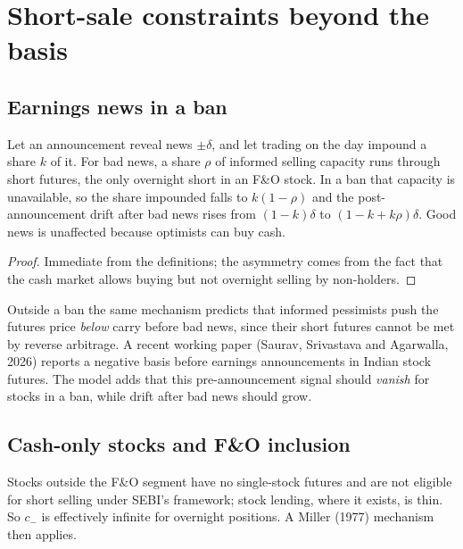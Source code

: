 \section{Short-sale constraints beyond the basis}\label{sec:short}
\subsection{Earnings news in a ban}
\begin{proposition}\label{prop:news}
Let an announcement reveal news $\pm\delta$, and let trading on the day impound a share $k$ of it. For bad news, a share
$\rho$ of informed selling capacity runs through short futures, the only overnight short in an F\&O stock. In a ban that
capacity is unavailable, so the share impounded falls to $k(1-\rho)$ and the post-announcement drift after bad news rises
from $(1-k)\delta$ to $(1-k+k\rho)\delta$. Good news is unaffected because optimists can buy cash.
\end{proposition}
\begin{proof}
Immediate from the definitions; the asymmetry comes from the fact that the cash market allows buying but not overnight
selling by non-holders.
\end{proof}
\begin{remark}
Outside a ban the same mechanism predicts that informed pessimists push the futures price \emph{below} carry before bad
news, since their short futures cannot be met by reverse arbitrage. A recent working paper (Saurav, Srivastava and
Agarwalla, 2026) reports a negative basis before earnings announcements in Indian stock futures. The model adds that this pre-announcement signal should \emph{vanish} for stocks in a ban, while drift after
bad news should grow.
\end{remark}

\subsection{Cash-only stocks and F\&O inclusion}
Stocks outside the F\&O segment have no single-stock futures and are not eligible for short selling under SEBI's
framework; stock lending, where it exists, is thin. So $c_-$ is effectively infinite for overnight positions. A Miller (1977) mechanism then applies.

